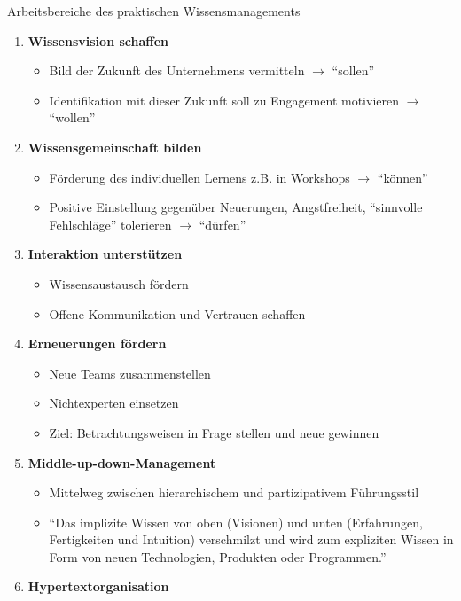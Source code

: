 {  Arbeitsbereiche des praktischen Wissensmanagements
  \begin{enumerate}
    \item \textbf{Wissensvision schaffen}
    \begin{itemize}
      \item Bild der Zukunft des Unternehmens vermitteln $\rightarrow$ ``sollen''
      \item Identifikation mit dieser Zukunft soll zu Engagement motivieren $\rightarrow$ ``wollen''
    \end{itemize}
    \item \textbf{Wissensgemeinschaft bilden}
    \begin{itemize}
      \item Förderung des individuellen Lernens z.B. in Workshops $\rightarrow$ ``können''
      \item Positive Einstellung gegenüber Neuerungen, Angstfreiheit, ``sinnvolle Fehlschläge'' tolerieren $\rightarrow$ ``dürfen''
    \end{itemize}
\framebreak
    \item \textbf{Interaktion unterstützen}
    \begin{itemize}
      \item Wissensaustausch fördern
      \item Offene Kommunikation und Vertrauen schaffen
    \end{itemize}
    \item \textbf{Erneuerungen fördern}
    \begin{itemize}
      \item Neue Teams zusammenstellen
      \item Nichtexperten einsetzen
      \item Ziel: Betrachtungsweisen in Frage stellen und neue gewinnen
    \end{itemize}
    \item \textbf{Middle-up-down-Management}
    \begin{itemize}
      \item Mittelweg zwischen hierarchischem und partizipativem Führungsstil
      \item ``Das implizite Wissen von oben (Visionen) und unten (Erfahrungen, Fertigkeiten und Intuition) verschmilzt und wird zum expliziten Wissen in Form von neuen Technologien, Produkten oder Programmen.'' \cite{Franken:2007}
    \end{itemize}
    \item \textbf{Hypertextorganisation}

\end{enumerate}}

